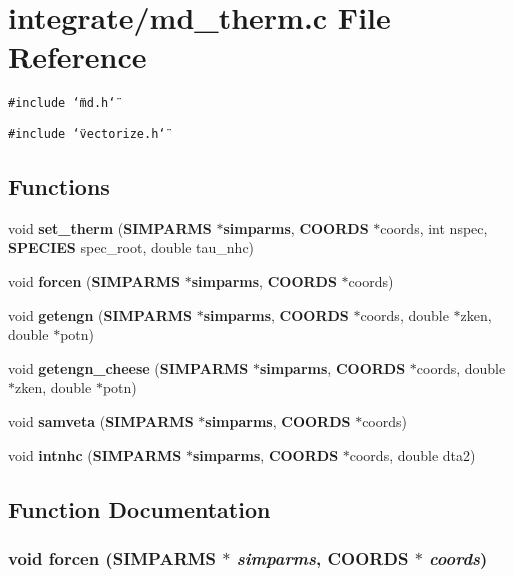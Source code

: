 \section{integrate/md\_\-therm.c File Reference}
\label{integrate_2md__therm_8c}
{\tt \#include \char`\"{}md.h\char`\"{}}\par
{\tt \#include \char`\"{}vectorize.h\char`\"{}}\par
\subsection*{Functions}
\begin{CompactItemize}
\item 
void {\bf set\_\-therm} ({\bf SIMPARMS} $\ast${\bf simparms}, {\bf COORDS} $\ast$coords, int nspec, {\bf SPECIES} spec\_\-root, double tau\_\-nhc)
\item 
void {\bf forcen} ({\bf SIMPARMS} $\ast${\bf simparms}, {\bf COORDS} $\ast$coords)
\item 
void {\bf getengn} ({\bf SIMPARMS} $\ast${\bf simparms}, {\bf COORDS} $\ast$coords, double $\ast$zken, double $\ast$potn)
\item 
void {\bf getengn\_\-cheese} ({\bf SIMPARMS} $\ast${\bf simparms}, {\bf COORDS} $\ast$coords, double $\ast$zken, double $\ast$potn)
\item 
void {\bf samveta} ({\bf SIMPARMS} $\ast${\bf simparms}, {\bf COORDS} $\ast$coords)
\item 
void {\bf intnhc} ({\bf SIMPARMS} $\ast${\bf simparms}, {\bf COORDS} $\ast$coords, double dta2)
\end{CompactItemize}


\subsection{Function Documentation}
\subsubsection{\setlength{\rightskip}{0pt plus 5cm}void forcen ({\bf SIMPARMS} $\ast$ {\em simparms}, {\bf COORDS} $\ast$ {\em coords})}\label{integrate_2md__therm_8c_18a1f8a3dcdc66a98c963a13b15e914c}


